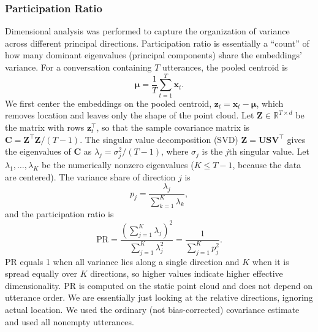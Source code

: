 \documentclass{article}
\begin{document}
\subsubsection{Participation Ratio}
Dimensional analysis was performed to capture the organization of variance across different principal directions. Participation ratio is essentially a ``count'' of how many dominant eigenvalues (principal components) share the embeddings’ variance. For a conversation containing $T$ utterances, the pooled centroid is
\begin{equation}
    \boldsymbol{\mu} =
    \frac{1}{T}\sum_{t=1}^{T}\mathbf{x}_t.
    \label{eq:conversation-centroid}
\end{equation}
We first center the
embeddings on the pooled centroid, $\mathbf{z}_t = \mathbf{x}_t -
\boldsymbol{\mu}$, which removes location and leaves only the shape of the
point cloud. Let $\mathbf{Z} \in \mathbb{R}^{T \times d}$ be the matrix with rows $\mathbf{z}_t^\top$, so that the sample covariance matrix is
$\mathbf{C} = \mathbf{Z}^\top\mathbf{Z}/(T-1)$. The singular value
decomposition (SVD) $\mathbf{Z} = \mathbf{U}\mathbf{S}\mathbf{V}^\top$ gives the
eigenvalues of $\mathbf{C}$ as $\lambda_j = \sigma_j^2/(T-1)$, where
$\sigma_j$ is the $j$th singular value. Let $\lambda_1,\ldots,\lambda_K$ be the numerically nonzero eigenvalues ($K \le T-1$, because the data are
centered). The variance share of direction $j$ is
\begin{equation}
    p_j = \frac{\lambda_j}{\sum_{k=1}^{K}\lambda_k},
\end{equation}
and the participation ratio is
\begin{equation}
    \mathrm{PR} =
    \frac{\left(\sum_{j=1}^{K}\lambda_j\right)^2}{\sum_{j=1}^{K}\lambda_j^2}
    = \frac{1}{\sum_{j=1}^{K}p_j^2}.
    \label{eq:participation-ratio}
\end{equation}
PR equals 1 when all variance lies along a single direction and $K$ when it is spread equally over $K$ directions, so higher values indicate higher effective dimensionality. PR is computed on the static point cloud and does not depend on utterance order. We are essentially just looking at the relative directions, ignoring actual location. We used the ordinary (not bias-corrected) covariance estimate and used all nonempty utterances. 

\end{document}
